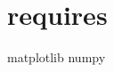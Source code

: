 \chapter{requires}
\hypertarget{md_dirac__solver_8egg-info_2requires}{}\label{md_dirac__solver_8egg-info_2requires}
matplotlib numpy 